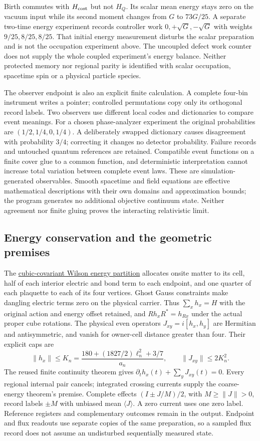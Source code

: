 Birth commutes with $H_{\rm cost}$ but not $H_Q$. Its scalar mean energy
stays zero on the vacuum input while its second moment changes from
$G$ to $73G/25$. A separate two-time energy experiment records controller
work $0,+\sqrt G,-\sqrt G$ with weights $9/25,8/25,8/25$.
That initial energy measurement disturbs the scalar preparation and is
not the occupation experiment above. The uncoupled defect work counter
does not supply the whole coupled experiment's energy balance. Neither
protected memory nor regional parity is identified with scalar occupation,
spacetime spin or a physical particle species.

The observer endpoint is also an explicit finite calculation. A complete
four-bin instrument writes a pointer; controlled permutations copy only
its orthogonal record labels. Two observers use different local codes
and dictionaries to compare event meanings. For a chosen phase-analyzer
experiment the original probabilities are $(1/2,1/4,0,1/4)$.
A deliberately swapped dictionary causes disagreement with probability
$3/4$; correcting it changes no detector probability. Failure records
and untouched quantum references are retained. Compatible event functions
on a finite cover glue to a common function, and deterministic
interpretation cannot increase total variation between complete event
laws. These are simulation-generated observables. Smooth spacetime and
field equations are effective mathematical descriptions with their own
domains and approximation bounds; the program generates no additional
objective continuum state. Neither agreement nor finite gluing proves
the interacting relativistic limit.

\subsection{Energy conservation and the geometric premises}

The \href{https://github.com/FloatingPragma/observer-patch-holography/blob/main/model/particle_primary_covariant_stress/PROOF.md}{cubic-covariant Wilson energy partition}
allocates onsite matter to its cell, half of each interior electric and
bond term to each endpoint, and one quarter of each plaquette to each
of its four vertices. Ghost Gauss constraints make dangling electric
terms zero on the physical carrier. Thus $\sum_xh_x=H$ with the original
action and energy offset retained, and $Rh_xR^*=h_{Rx}$ under the actual
proper cube rotations. The physical even
operators $J_{xy}=i[h_x,h_y]$ are Hermitian and antisymmetric, and vanish
for owner-cell distance greater than four. Their explicit caps are
\[
 \|h_x\|\le K_n=\frac{180+(1827/2)\ell_n^2+3/7}{a_n},
 \qquad \|J_{xy}\|\le2K_n^2.
\]
The reused finite continuity theorem gives
$\partial_t h_x(t)+\sum_yJ_{xy}(t)=0$. Every regional internal pair
cancels; integrated crossing currents supply the coarse-energy theorem's
premise. Complete effects $(I\pm J/M)/2$, with $M\ge\|J\|>0$, record
labels $\pm M$ with unbiased mean $\langle J\rangle$. A zero current
uses one zero label. Reference registers and complementary outcomes
remain in the output. Endpoint and flux readouts use separate copies of
the same preparation, so a sampled flux record does not assume an
undisturbed sequentially measured state.

